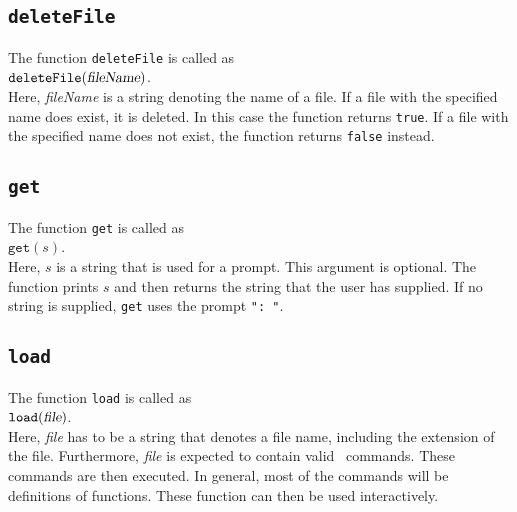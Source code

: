 \subsection{\texttt{deleteFile}}
The function \texttt{deleteFile} is called as
\\[0.2cm]
\hspace*{1.3cm}
$\mathtt{deleteFile}(\textsl{fileName})$.
\\[0.2cm]
Here, \textsl{fileName} is a string denoting the name of a file.
If a file with the specified name does exist, it is deleted.  In this case the function
returns \texttt{true}.  If a file with the specified name does not exist, the function
returns \texttt{false} instead.

\subsection{\texttt{get}}
The function \texttt{get}  is called as
\\[0.2cm]
\hspace*{1.3cm}
$\mathtt{get}(s)$.
\\[0.2cm]
Here, $s$ is a string that is used for a prompt. This argument is optional.  The function prints $s$ and then
returns the string that the user has supplied.  If no string is supplied, \texttt{get}
uses the prompt \texttt{": "}.

\subsection{\texttt{load}}
The function \texttt{load}  is called as
\\[0.2cm]
\hspace*{1.3cm}
$\mathtt{load}(\textsl{file})$.
\\[0.2cm]
Here, \textsl{file} has to be a string that denotes a file name, including  the extension
of the file.  Furthermore, \textsl{file} is expected to contain valid \setlx\ commands.
These commands are then executed.  In general, most of the commands will be definitions of
functions.  These function can then be used interactively.

